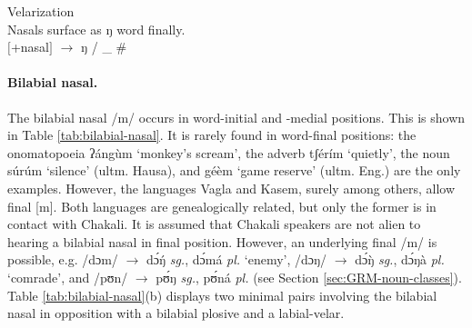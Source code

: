 \begin{Gen}\label{Gen-nas-vel}{Velarization}\\
Nasals surface as {\sls ŋ} word finally.\\
$[${\sc +nasal}$]$  $\rightarrow$   {\sls ŋ}  / \_ \#
\end{Gen}

% 
% 



\paragraph{Bilabial nasal.}
\label{sec:PHON-bil-nas}

The bilabial nasal /{\sls m}/ occurs in word-initial and -medial positions. 
This 
is shown in Table \ref{tab:bilabial-nasal}. It is rarely  found in  word-final 
positions: the onomatopoeia {\sls ʔángùm} `monkey's scream', the adverb {\sls  
tʃérím} `quietly',   the noun {\sls súrúm} `silence' (ultm. Hausa), and  
{\sls 
géèm} `game reserve' (ultm. Eng.) are the only examples.  However, the languages 
Vagla and Kasem, surely among others,  allow final [{\sls m}]. Both languages 
are 
genealogically related,  but only the former is in contact with Chakali. It is 
assumed that Chakali speakers  are not alien to hearing   a bilabial nasal  in 
final position. However, an underlying final /{\sls m}/ is possible, e.g. /dɔm/ 
$\rightarrow$ {\sls dɔ́ŋ́} {\it sg.}, {\sls dɔ́má}  {\it pl.} `enemy',   /dɔŋ/ 
$\rightarrow$ {\sls dɔ́ŋ̀} {\it sg.}, {\sls dɔ́ŋà}  {\it pl.}  `comrade', and 
/pʊn/ $\rightarrow$ {\sls pʊ́ŋ} {\it sg.}, {\sls pʊ́ná}  {\it pl.}   (see 
Section 
\ref{sec:GRM-noun-classes}). Table \ref{tab:bilabial-nasal}(b) displays two 
minimal pairs involving the bilabial nasal in opposition with a bilabial plosive 
and  a labial-velar.

